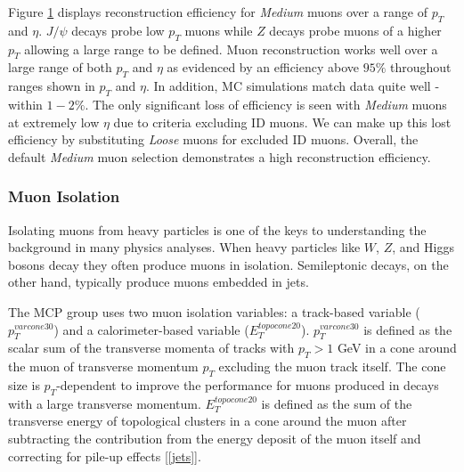 \begin{figure}[!h]
  \label{fig:efficiency}
\end{figure}

Figure \ref{fig:efficiency} displays reconstruction efficiency for \textit{Medium} muons over a range of $p_T$ and $\eta$. $J/\psi$ decays probe low $p_T$ muons while $Z$ decays probe muons of a higher $p_T$ allowing a large range to be defined.  Muon reconstruction works well over a large range of both $p_T$ and $\eta$ as evidenced by an efficiency above $95\%$ throughout ranges shown in $p_T$ and $\eta$. In addition, MC simulations match data quite well - within $1-2\%$. The only significant loss of efficiency is seen with \textit{Medium} muons at extremely low $\eta$ due to criteria excluding ID muons. We can make up this lost efficiency by substituting \textit{Loose} muons for excluded ID muons. Overall, the default \textit{Medium} muon selection demonstrates a high reconstruction efficiency. 

\subsubsection{Muon Isolation} 
\par \hspace{20pt} Isolating muons from heavy particles is one of the keys to understanding the background in many physics analyses. When heavy particles like $W$, $Z$, and Higgs bosons decay they often produce muons in isolation. Semileptonic decays, on the other hand, typically produce muons embedded in jets.

\par \hspace{20pt} The MCP group uses two muon isolation variables: a track-based variable ($p_T^{varcone30}$) and a calorimeter-based variable ($E_T^{topocone20}$). $p_T^{varcone30}$ is defined as the scalar sum of the transverse momenta of tracks with $p_T > 1$ GeV in a cone around the muon of transverse momentum $p_T$ excluding the muon track itself. The cone size is $p_T$-dependent to improve the performance for muons produced in decays with a large transverse momentum. $E_T^{topocone20}$ is defined as the sum of the transverse energy of topological clusters in a cone around the muon after subtracting the contribution from the energy deposit of the muon itself and correcting for pile-up effects [\ref{jets}]. 

